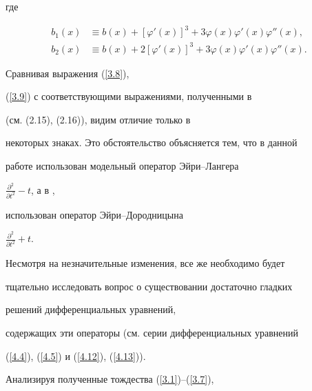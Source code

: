 где


\begin{equation}


\label{3.9}


\begin{split}


b_1 (x) &\equiv b(x) + [\varphi '(x)]^3 + 3\varphi(x) \varphi


'(x) \varphi ''(x),\\


b_2 (x) &\equiv b(x) + 2 [\varphi '(x)]^3 +


3\varphi(x) \varphi '(x) \varphi ''(x) .


\end{split}


\end{equation}








\begin{note}


Сравнивая выражения (\ref{3.8}),


(\ref{3.9}) с соответствующими выражениями, полученными в


\cite{Bobochko2} (см. (2.15), (2.16)), видим отличие только в


некоторых знаках. Это обстоятельство объясняется тем, что в данной


работе использован модельный оператор Эйри--Лангера


$\frac{\partial^2}{\partial t^2} - t$, а в \cite{Bobochko1},


\cite{Bobochko2} использован оператор Эйри--Дородницына


$\frac{\partial^2}{\partial t^2} + t$.


Несмотря на незначительные изменения, все же необходимо будет


тщательно исследовать вопрос о существовании достаточно гладких


решений дифференциальных уравнений,


содержащих эти операторы (см. серии дифференциальных уравнений


(\ref{4.4}), (\ref{4.5}) и (\ref{4.12}), (\ref{4.13})).


\end{note}





Анализируя полученные тождества (\ref{3.1})--(\ref{3.7}), 


